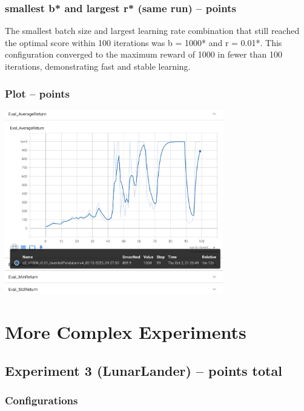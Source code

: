 \documentclass{article}
\begin{document}
\subsubsection{smallest \textbf{b*} and largest \textbf{r*} (same run) --  points\rbrack}
\begin{answer}[title=Q5.2.2,height=4cm,width=\linewidth]
The smallest batch size and largest learning rate combination that still reached the optimal score within 100 iterations was b = 1000* and r = 0.01*. This configuration converged to the maximum reward of 1000 in fewer than 100 iterations, demonstrating fast and stable learning.
\end{answer}

\subsubsection{Plot --  points\rbrack}
\begin{answer}[title=Q5.2.3,height=10cm,width=\linewidth]
\centering
\includegraphics[height=8cm]{q2.png}
\end{answer}

\setcounter{section}{6}
\section{More Complex Experiments}

\subsection{Experiment 3 (LunarLander) --  points total\rbrack}

\subsubsection{Configurations}
\end{document}
